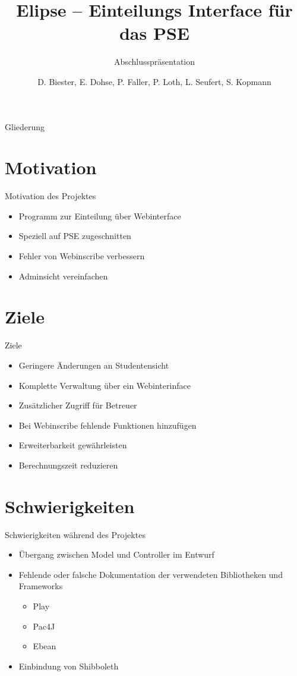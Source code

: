 \documentclass[18pt]{beamer}
\title[Elipse]{Elipse -- Einteilungs Interface für das PSE}
\subtitle{Abschlusspräsentation}
\author{D. Biester, E. Dohse, P. Faller, P. Loth, L. Seufert, S. Kopmann}
\institute{IPD Snelting}
\begin{document}

\begin{frame}
\titlepage
\end{frame}

\begin{frame}{Gliederung}
\tableofcontents
\end{frame}

\section{Motivation}
\begin{frame}{Motivation des Projektes}
\begin{itemize}
\item Programm zur Einteilung über Webinterface
\item Speziell auf PSE zugeschnitten
\item Fehler von Webinscribe verbessern
\item Adminsicht vereinfachen
\end{itemize}
\end{frame}

\section{Ziele}
\begin{frame}{Ziele}
\begin{itemize}
\item Geringere Änderungen an Studentensicht
\item Komplette Verwaltung über ein Webinterinface
\item Zusätzlicher Zugriff für Betreuer
\item Bei Webinscribe fehlende Funktionen hinzufügen
\item Erweiterbarkeit gewährleisten
\item Berechnungszeit reduzieren
\end{itemize}
\end{frame}

\section{Schwierigkeiten}
\begin{frame}{Schwierigkeiten während des Projektes}
\begin{itemize}
\item Übergang zwischen Model und Controller im Entwurf
\item Fehlende oder falsche Dokumentation der verwendeten Bibliotheken
und Frameworks
\begin{itemize}
\item Play
\item Pac4J
\item Ebean
\end{itemize}
\item Einbindung von Shibboleth
\end{itemize}
\end{frame}
\end{document}
